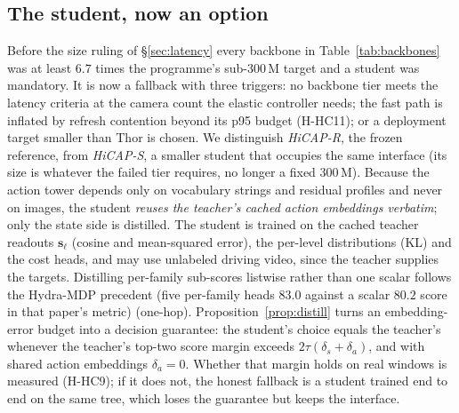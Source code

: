 \subsection{The student, now an option}\label{sec:student}
Before the size ruling of \S\ref{sec:latency} every backbone in Table~\ref{tab:backbones} was at least $6.7$ times the programme's sub-300\,M target and a student was mandatory. It is now a fallback with three triggers: no backbone tier meets the latency criteria at the camera count the elastic controller needs; the fast path is inflated by refresh contention beyond its p95 budget (H-HC11); or a deployment target smaller than Thor is chosen. We distinguish \emph{HiCAP-R}, the frozen reference, from \emph{HiCAP-S}, a smaller student that occupies the same interface (its size is whatever the failed tier requires, no longer a fixed $300$\,M). Because the action tower depends only on vocabulary strings and residual profiles and never on images, the student \emph{reuses the teacher's cached action embeddings verbatim}; only the state side is distilled. The student is trained on the cached teacher readouts $\mathbf s_\ell$ (cosine and mean-squared error), the per-level distributions (KL) and the cost heads, and may use unlabeled driving video, since the teacher supplies the targets. Distilling per-family sub-scores listwise rather than one scalar follows the Hydra-MDP precedent (five per-family heads $83.0$ against a scalar $80.2$ score in that paper's metric)\evP{} (one-hop). Proposition~\ref{prop:distill} turns an embedding-error budget into a decision guarantee: the student's choice equals the teacher's whenever the teacher's top-two score margin exceeds $2\tau(\delta_s+\delta_a)$, and with shared action embeddings $\delta_a=0$. Whether that margin holds on real windows is measured (H-HC9); if it does not, the honest fallback is a student trained end to end on the same tree, which loses the guarantee but keeps the interface.
